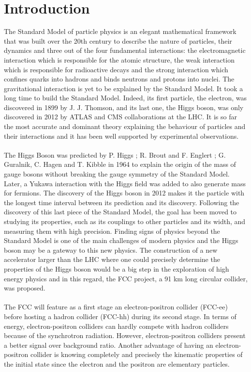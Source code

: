 \documentclass[a4paper,11pt]{article}
\begin{document}
	\section{Introduction}
	The Standard Model of particle physics is an elegant mathematical framework that was built over the 20th century to describe the nature of particles, their dynamics and three out of the four fundamental interactions: the electromagnetic interaction which is responsible for the atomic structure, the weak interaction which is responsible for radioactive decays and the strong interaction which confines quarks into hadrons and binds neutrons and protons into nuclei. The gravitational interaction is yet to be explained by the Standard Model. It took a long time to build the Standard Model. Indeed, its first particle, the electron, was discovered in 1899 by J. J. Thomson, and its last one, the Higgs boson, was only discovered in 2012 by \acrshort{ATLAS} \cite{atlas2012observation} and \acrshort{CMS} \cite{cms2012observation} collaborations at the \acrshort{LHC}. It is so far the most accurate and dominant theory explaining the behaviour of particles and their interactions and it has been well supported by experimental observations.\\\\
	The Higgs Boson was predicted by P. Higgs \cite{higgs1964broken}; R. Brout and F. Englert \cite{englert1964broken}; G. Guralnik, C. Hagen and T. Kibble \cite{guralnik1964global} in 1964 to explain the origin of the mass of gauge bosons without breaking the gauge symmetry of the Standard Model. Later, a Yukawa interaction with the Higgs field was added to also generate mass for fermions. The discovery of the Higgs boson in 2012 makes it the particle with the longest time interval between its prediction and its discovery. Following the discovery of this last piece of the Standard Model, the goal has been moved to studying its properties, such as its couplings to other particles and its width, 
	and measuring them with high precision. Finding signs of physics beyond the Standard Model is one of the main challenges of modern physics and the Higgs boson may be a gateway to this new physics. The construction of a new accelerator larger than the LHC where one could precisely determine the properties of the Higgs boson would be a big step in the exploration of high energy physics and in this regard, the FCC project, a 91 km long circular collider, was proposed.\\\\
	The \acrshort{FCC} will feature as a first stage an electron-positron collider (FCC-ee) before hosting a hadron collider (FCC-hh) during its second stage. In terms of energy, electron-positron colliders can hardly compete with hadron colliders because of the synchrotron radiation. However, electron-positron colliders present a better signal over background ratio. Another advantage of having an electron-positron collider is knowing completely and precisely the kinematic properties of the initial state since the electron and the positron are elementary particles.\\\\
\end{document}
